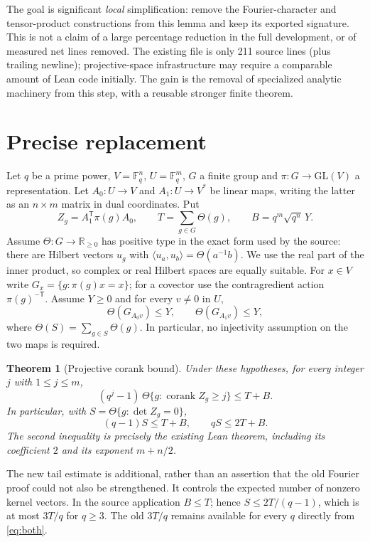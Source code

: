 \documentclass[11pt]{article}
\newtheorem{theorem}{Theorem}[section]
\theoremstyle{remark}\newtheorem{remark}[theorem]{Remark}
\newcommand{\F}{\mathbb F}
\newcommand{\wt}{\Theta}
\begin{document}
The goal is significant \emph{local} simplification: remove the Fourier-character and tensor-product constructions from this lemma and keep its exported signature. This is not a claim of a large percentage reduction in the full development, or of measured net lines removed. The existing file is only 211 source lines (plus trailing newline); projective-space infrastructure may require a comparable amount of Lean code initially. The gain is the removal of specialized analytic machinery from this step, with a reusable stronger finite theorem.

\section{Precise replacement}
Let $q$ be a prime power, $V=\F_q^n$, $U=\F_q^m$, $G$ a finite group and $\pi:G\to\mathrm{GL}(V)$ a representation. Let $A_0:U\to V$ and $A_1:U\to V^*$ be linear maps, writing the latter as an $n\times m$ matrix in dual coordinates. Put
\[
 Z_g=A_1^{\mathsf T}\pi(g)A_0,\qquad
 T=\sum_{g\in G}\wt(g),\qquad B=q^m\sqrt{q^n}\,Y.
\]
Assume $\wt:G\to\mathbb R_{\ge0}$ has positive type in the exact form used by the source: there are Hilbert vectors $u_g$ with $\langle u_a,u_b\rangle=\wt(a^{-1}b)$. We use the real part of the inner product, so complex or real Hilbert spaces are equally suitable. For $x\in V$ write $G_x=\{g:\pi(g)x=x\}$; for a covector use the contragredient action $\pi(g)^{-\mathsf T}$. Assume $Y\ge0$ and for every $v\ne0$ in $U$,
\begin{equation}\label{eq:stab}
 \wt(G_{A_0v})\le Y,\qquad \wt(G_{A_1v})\le Y,
\end{equation}
where $\wt(S)=\sum_{g\in S}\wt(g)$. In particular, no injectivity assumption on the two maps is required.

\begin{theorem}[Projective corank bound]\label{thm:corank}
Under these hypotheses, for every integer $j$ with $1\le j\le m$,
\begin{equation}\label{eq:tail}
 (q^j-1)\,\wt\{g:\operatorname{corank}Z_g\ge j\}\le T+B.
\end{equation}
In particular, with $S=\wt\{g:\det Z_g=0\}$,
\begin{equation}\label{eq:both}
 (q-1)S\le T+B,\qquad qS\le 2T+B.
\end{equation}
The second inequality is precisely the existing Lean theorem, including its coefficient $2$ and its exponent $m+n/2$.
\end{theorem}
The new tail estimate is additional, rather than an assertion that the old Fourier proof could not also be strengthened. It controls the expected number of nonzero kernel vectors. In the source application $B\le T$; hence $S\le2T/(q-1)$, which is at most $3T/q$ for $q\ge3$. The old $3T/q$ remains available for every $q$ directly from \eqref{eq:both}.
\end{document}
